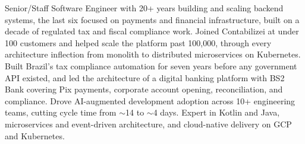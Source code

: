 \documentclass[11pt,a4paper,sans]{moderncv}
\begin{document}
\makecvtitle


\vspace{6pt}
\small{Senior/Staff Software Engineer with 20+ years building and scaling backend systems, the
last six focused on payments and financial infrastructure, built on a decade of regulated tax and
fiscal compliance work. Joined Contabilizei at under 100 customers and helped scale
the platform past 100,000, through every architecture inflection from monolith to distributed
microservices on Kubernetes. Built Brazil's tax compliance automation for seven years before any
government API existed, and led the architecture of a digital banking platform with BS2 Bank
covering Pix payments, corporate account opening, reconciliation, and compliance. Drove
AI-augmented development adoption across 10+ engineering teams, cutting cycle time from
$\sim$14 to $\sim$4 days. Expert in Kotlin and Java, microservices and event-driven
architecture, and cloud-native delivery on GCP and Kubernetes.}

\end{document}
